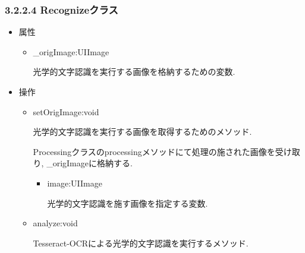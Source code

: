 \subsubsection{3.2.2.4 Recognizeクラス}
\begin{itemize}
\item 属性

\begin{itemize}
\item \_origImage:UIImage

光学的文字認識を実行する画像を格納するための変数.
\end{itemize}

\item 操作

\begin{itemize}
\item setOrigImage:void

光学的文字認識を実行する画像を取得するためのメソッド.

Processingクラスのprocessingメソッドにて処理の施された画像を受け取り, \_origImageに格納する.
\begin{itemize}
\item image:UIImage

光学的文字認識を施す画像を指定する変数.
\end{itemize}

\item analyze:void

Tesseract-OCRによる光学的文字認識を実行するメソッド.
\end{itemize}

\end{itemize}

